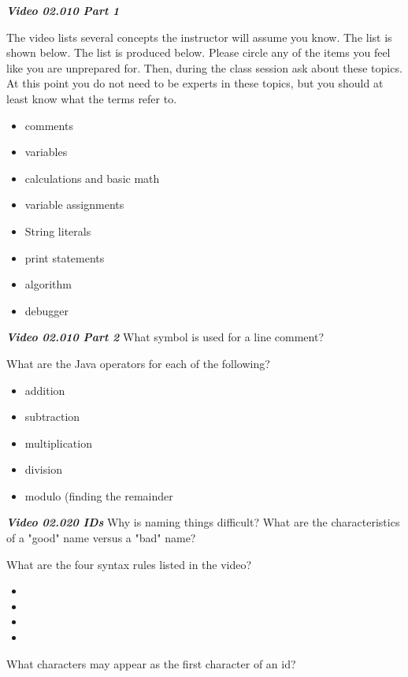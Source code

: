 \documentclass[letterpaper,11pt]{exam}
\newcommand{\videoheading}[1]{\Large\textbf{\textit{#1}}}
\begin{document}
\videoheading{Video 02.010 Part 1}

\begin{questions}
\begin{samepage}
\question The video lists several concepts the instructor will assume you know.  The list is shown below.  The list is produced below.  Please circle any of the items you feel like you are unprepared for.  Then, during the class session ask about these topics.  At this point you do not need to be experts in these topics, but you should at least know what the terms refer to.
\begin{itemize}
  \item comments
  \item variables
  \item calculations and basic math
  \item variable assignments
  \item String literals
  \item print statements
  \item algorithm
  \item debugger
\end{itemize}
\end{samepage}

\videoheading{Video 02.010 Part 2}  
\question What symbol is used for a line comment? \makebox[4em]{\hrulefill}

\begin{samepage}
\question What are the Java operators for each of the following?
\begin{itemize}
  \item \makebox[2em]{\hrulefill}   addition 
  \item \makebox[2em]{\hrulefill}    subtraction
  \item \makebox[2em]{\hrulefill}    multiplication
  \item \makebox[2em]{\hrulefill}    division
  \item \makebox[2em]{\hrulefill}   modulo (finding the remainder
\end{itemize}
\end{samepage}

\videoheading{Video 02.020 IDs}
 \question Why is naming things difficult?  What are the characteristics of a "good" name versus a "bad" name?
 \vspace{1.5cm}
 
  
 \begin{samepage}
 \question What are the four syntax rules listed in the video?
 \begin{itemize}
    \item 
    \item 
    \item 
    \item 
  \end{itemize}
 \end{samepage}
 \question What characters may appear as the first character of an id?


\end{questions}
\end{document}
